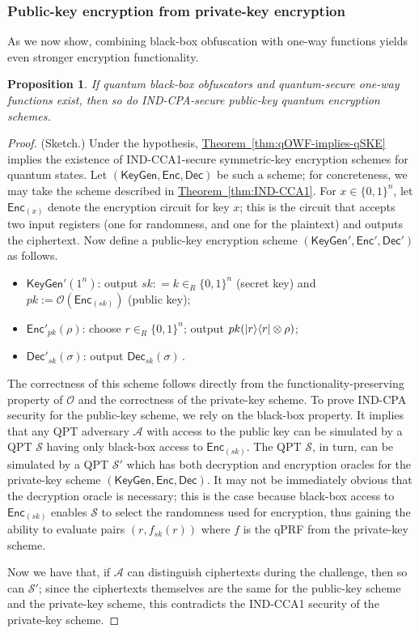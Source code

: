 \documentclass[11pt]{article}
\numberwithin{equation}{section}
\newtheorem{prop}{Proposition}
\newcommand{\expref}[2]{\texorpdfstring{\hyperref[#2]{#1~\ref{#2}}}{#1~\ref{#2}}}
\newcommand{\algo}{\mathcal}
\newcommand{\KeyGen}{\ensuremath{\mathsf{KeyGen}}\xspace}
\newcommand{\Enc}{\ensuremath{\mathsf{Enc}}\xspace}
\newcommand{\Dec}{\ensuremath{\mathsf{Dec}}\xspace}
\newcommand{\inrand}{\in_R}
\begin{document}
\subsubsection{Public-key encryption from private-key encryption}

As we now show, combining black-box obfuscation with one-way functions yields even stronger encryption functionality.

\begin{prop}\label{prop:PKE}
If quantum black-box obfuscators and quantum-secure one-way functions exist, then so do IND-CPA-secure public-key quantum encryption schemes.
\end{prop}
\begin{proof} (Sketch.)
Under the hypothesis, \expref{Theorem}{thm:qOWF-implies-qSKE} implies the existence of IND-CCA1-secure symmetric-key encryption schemes for quantum states. Let $(\KeyGen, \Enc, \Dec)$ be such a scheme; for concreteness, we may take the scheme described in \expref{Theorem}{thm:IND-CCA1}. For $x \in \{0, 1\}^n$, let $\Enc_{(x)}$ denote the encryption circuit for key $x$; this is the circuit that accepts two input registers (one for randomness, and one for the plaintext) and outputs the ciphertext. Now define a public-key encryption scheme $(\KeyGen', \Enc', \Dec')$ as follows.
\begin{itemize}
\item $\KeyGen'(1^n)$: output $sk : = k \inrand \{0, 1\}^n$ (secret key) and $pk := \algo O\left(\Enc_{(sk)}\right)$ (public key);
\item $\Enc'_{pk}(\rho)$: choose $r \inrand \{0, 1\}^n$; output $pk( {\left\vert{r}\right\rangle}{\left\langle{r}\right\vert} \otimes \rho)$;
\item $\Dec'_{sk}(\sigma)$: output  $\Dec_{sk}(\sigma)$\,.
\end{itemize}
The correctness of this scheme follows directly from the functionality-preserving property of $\algo O$ and the correctness of the private-key scheme. To prove IND-CPA security for the public-key scheme, we rely on the black-box property. It implies that any QPT adversary $\algo A$ with access to the public key can be simulated by a QPT $\algo S$ having only black-box access to $\Enc_{(sk)}$. The QPT $\algo S$, in turn, can be simulated by a QPT $\algo S'$ which has both decryption and encryption oracles for the private-key scheme $(\KeyGen, \Enc, \Dec)$. It may not be immediately obvious that the decryption oracle is necessary; this is the case because black-box access to $\Enc_{(sk)}$ enables $\algo S$ to select the randomness used for encryption, thus gaining the ability to evaluate pairs $(r, f_{sk}(r))$ where $f$ is the qPRF from the private-key scheme. 

Now we have that, if $\algo A$ can distinguish ciphertexts during the challenge, then so can $\algo S'$; since the ciphertexts themselves are the same for the public-key scheme and the private-key scheme, this contradicts the IND-CCA1 security of the private-key scheme.
\end{proof}
\end{document}

